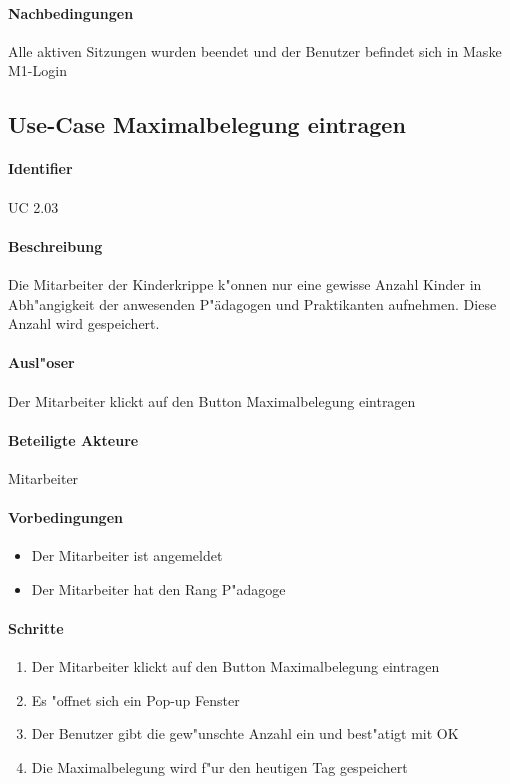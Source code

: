   \paragraph{Nachbedingungen}
  Alle aktiven Sitzungen wurden beendet und der Benutzer befindet sich in Maske M1-Login

  
 \newpage
 \subsection{Use-Case Maximalbelegung eintragen}
  \paragraph{Identifier}
  UC 2.03
  \paragraph{Beschreibung}
  Die Mitarbeiter der Kinderkrippe k"onnen nur eine gewisse Anzahl Kinder in Abh"angigkeit der anwesenden P"ädagogen und Praktikanten aufnehmen. Diese Anzahl wird gespeichert.
  \paragraph{Ausl"oser}
  Der Mitarbeiter klickt auf den Button \dq Maximalbelegung eintragen\dq
  \paragraph{Beteiligte Akteure}   \leavevmode \newline
    Mitarbeiter
  \paragraph{Vorbedingungen}
  \begin{itemize}
   \item Der Mitarbeiter ist angemeldet
   \item Der Mitarbeiter hat den Rang \dq P"adagoge\dq
  \end{itemize}

  \paragraph{Schritte}
  \begin{enumerate}
   \item Der Mitarbeiter klickt auf den Button \dq Maximalbelegung eintragen\dq
   \item Es "offnet sich ein Pop-up Fenster
   \item Der Benutzer gibt die gew"unschte Anzahl ein und best"atigt mit \dq OK\dq
   \item Die Maximalbelegung wird f"ur den heutigen Tag gespeichert
  \end{enumerate}

